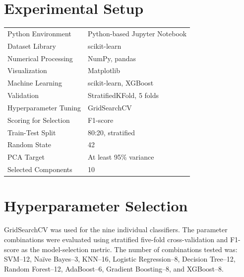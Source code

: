 \documentclass[12pt,a4paper]{article}
\begin{document}
\section{Experimental Setup}

\begin{tabular}{ll}
\toprule
Python Environment & Python-based Jupyter Notebook\\
Dataset Library & scikit-learn\\
Numerical Processing & NumPy, pandas\\
Visualization & Matplotlib\\
Machine Learning & scikit-learn, XGBoost\\
Validation & StratifiedKFold, 5 folds\\
Hyperparameter Tuning & GridSearchCV\\
Scoring for Selection & F1-score\\
Train-Test Split & 80:20, stratified\\
Random State & 42\\
PCA Target & At least 95\% variance\\
Selected Components & 10\\
\bottomrule
\end{tabular}

\section{Hyperparameter Selection}

GridSearchCV was used for the nine individual classifiers. The parameter combinations were evaluated using stratified five-fold cross-validation and F1-score as the model-selection metric. The number of combinations tested was: SVM--12, Na\"ive Bayes--3, KNN--16, Logistic Regression--8, Decision Tree--12, Random Forest--12, AdaBoost--6, Gradient Boosting--8, and XGBoost--8.
\end{document}
